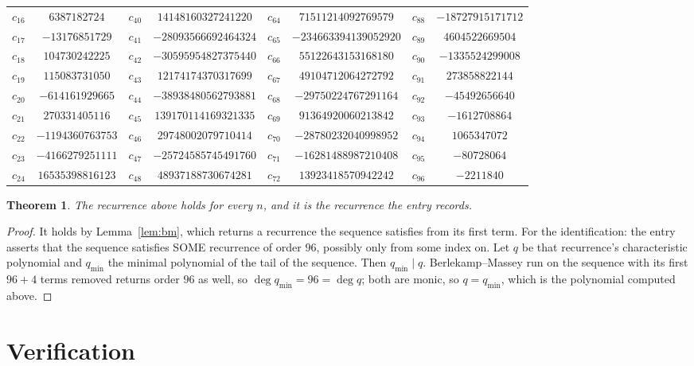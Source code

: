 \documentclass[11pt,a4paper]{article}
\theoremstyle{plain}
\newtheorem{theorem}{Theorem}
\theoremstyle{definition}
\begin{document}
\begin{center}
\begin{tabular}{cccccccc}
$c_{16}$ & $6387182724$ & $c_{40}$ & $14148160327241220$ & $c_{64}$ & $71511214092769579$ & $c_{88}$ & $-18727915171712$ \\
$c_{17}$ & $-13176851729$ & $c_{41}$ & $-28093566692464324$ & $c_{65}$ & $-234663394139052920$ & $c_{89}$ & $4604522669504$ \\
$c_{18}$ & $104730242225$ & $c_{42}$ & $-30595954827375440$ & $c_{66}$ & $55122643153168180$ & $c_{90}$ & $-1335524299008$ \\
$c_{19}$ & $115083731050$ & $c_{43}$ & $12174174370317699$ & $c_{67}$ & $49104712064272792$ & $c_{91}$ & $273858822144$ \\
$c_{20}$ & $-614161929665$ & $c_{44}$ & $-38938480562793881$ & $c_{68}$ & $-29750224767291164$ & $c_{92}$ & $-45492656640$ \\
$c_{21}$ & $270331405116$ & $c_{45}$ & $139170114169321335$ & $c_{69}$ & $91364920060213842$ & $c_{93}$ & $-1612708864$ \\
$c_{22}$ & $-1194360763753$ & $c_{46}$ & $29748002079710414$ & $c_{70}$ & $-28780232040998952$ & $c_{94}$ & $1065347072$ \\
$c_{23}$ & $-4166279251111$ & $c_{47}$ & $-25724585745491760$ & $c_{71}$ & $-16281488987210408$ & $c_{95}$ & $-80728064$ \\
$c_{24}$ & $16535398816123$ & $c_{48}$ & $48937188730674281$ & $c_{72}$ & $13923418570942242$ & $c_{96}$ & $-2211840$ \\
\end{tabular}
\end{center}

\begin{theorem}
The recurrence above holds for every $n$, and it is the recurrence the entry records.
\end{theorem}

\begin{proof}
It holds by Lemma~\ref{lem:bm}, which returns a recurrence the sequence satisfies from its
first term. For the identification: the entry asserts that the sequence satisfies SOME
recurrence of order $96$, possibly only from some index on. Let $q$ be that recurrence's
characteristic polynomial and $q_{\min}$ the minimal polynomial of the tail of the sequence.
Then $q_{\min}\mid q$. Berlekamp--Massey run on the sequence with its first $96+4$ terms
removed returns order $96$ as well, so $\deg q_{\min}=96=\deg q$; both are monic, so
$q=q_{\min}$, which is the polynomial computed above.
\end{proof}

\section{Verification}
\end{document}
